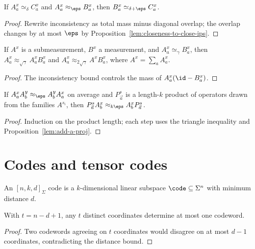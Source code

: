 \begin{proposition}\label{lem:transfer-cons}
  If $A^x_a\simeq_\delta C^x_a$ and $A^x_a\approx_\eps B^x_a$,
  then $B^x_a\simeq_{\delta+\eps} C^x_a$.
\end{proposition}
\begin{proof}
  Rewrite inconsistency as total mass minus diagonal overlap; the overlap
  changes by at most $\eps$ by Proposition~\ref{lem:closeness-to-close-ips}.
\end{proof}

\begin{proposition}\label{lem:cons-sub-meas}
  If $A^x$ is a submeasurement, $B^x$ a measurement, and
  $A^x_a\simeq_\gamma B^x_a$, then
  $A^x_a\approx_{\sqrt\gamma} A^x_a B^x_a$
  and $A^x_a\approx_{2\sqrt\gamma} A^x B^x_a$,
  where $A^x=\sum_a A^x_a$.
\end{proposition}
\begin{proof}
  The inconsistency bound controls the mass of $A^x_a(\id-B^x_a)$.
\end{proof}

\begin{proposition}[Switcheroo]\label{lem:switcheroo}
  If $A^x_a A^y_b\approx_\eps A^y_b A^x_a$ on average and $P^s_{\vec a}$ is
  a length-$k$ product of operators drawn from the families $A^{s_i}$, then
  $P^s_{\vec a}A^x_b\approx_{k\eps}A^x_b P^s_{\vec a}$.
\end{proposition}
\begin{proof}
  Induction on the product length; each step uses the triangle inequality
  and Proposition~\ref{lem:add-a-proj}.
\end{proof}

\section{Codes and tensor codes}

\begin{definition}\label{def:code}
  An $[n,k,d]_\Sigma$ code is a $k$-dimensional linear subspace
  $\code\subseteq\Sigma^n$ with minimum distance $d$.
\end{definition}

\begin{proposition}\label{prop:distance0}
  With $t=n-d+1$, any $t$ distinct coordinates determine at most one codeword.
\end{proposition}
\begin{proof}
  Two codewords agreeing on $t$ coordinates would disagree on at most $d-1$
  coordinates, contradicting the distance bound.
\end{proof}

